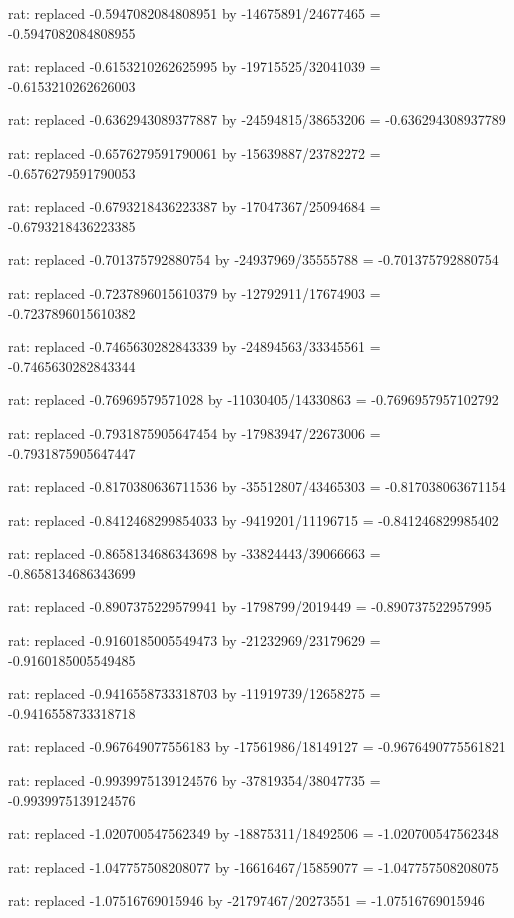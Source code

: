 \documentclass[a4paper,10pt]{article}
\begin{document}
\begin{eulernotebook}
\begin{eulercomment}
\begin{eulercomment}
\begin{eulercomment}
\begin{eulercomment}
\begin{eulercomment}
\begin{eulercomment}
\begin{eulercomment}
\begin{eulercomment}
\begin{eulercomment}
\begin{eulercomment}
\begin{eulercomment}
\begin{eulercomment}
\begin{eulercomment}
\begin{eulercomment}
\begin{eulercomment}
\begin{eulercomment}
\begin{euleroutput}
  rat: replaced -0.5947082084808951 by -14675891/24677465 = -0.5947082084808955
  
  rat: replaced -0.6153210262625995 by -19715525/32041039 = -0.6153210262626003
  
  rat: replaced -0.6362943089377887 by -24594815/38653206 = -0.636294308937789
  
  rat: replaced -0.6576279591790061 by -15639887/23782272 = -0.6576279591790053
  
  rat: replaced -0.6793218436223387 by -17047367/25094684 = -0.6793218436223385
  
  rat: replaced -0.701375792880754 by -24937969/35555788 = -0.701375792880754
  
  rat: replaced -0.7237896015610379 by -12792911/17674903 = -0.7237896015610382
  
  rat: replaced -0.7465630282843339 by -24894563/33345561 = -0.7465630282843344
  
  rat: replaced -0.76969579571028 by -11030405/14330863 = -0.7696957957102792
  
  rat: replaced -0.7931875905647454 by -17983947/22673006 = -0.7931875905647447
  
  rat: replaced -0.8170380636711536 by -35512807/43465303 = -0.817038063671154
  
  rat: replaced -0.8412468299854033 by -9419201/11196715 = -0.841246829985402
  
  rat: replaced -0.8658134686343698 by -33824443/39066663 = -0.8658134686343699
  
  rat: replaced -0.8907375229579941 by -1798799/2019449 = -0.890737522957995
  
  rat: replaced -0.9160185005549473 by -21232969/23179629 = -0.9160185005549485
  
  rat: replaced -0.9416558733318703 by -11919739/12658275 = -0.9416558733318718
  
  rat: replaced -0.967649077556183 by -17561986/18149127 = -0.9676490775561821
  
  rat: replaced -0.9939975139124576 by -37819354/38047735 = -0.9939975139124576
  
  rat: replaced -1.020700547562349 by -18875311/18492506 = -1.020700547562348
  
  rat: replaced -1.047757508208077 by -16616467/15859077 = -1.047757508208075
  
  rat: replaced -1.07516769015946 by -21797467/20273551 = -1.07516769015946
  

\end{euleroutput}
\end{eulercomment}
\end{eulercomment}
\end{eulercomment}
\end{eulercomment}
\end{eulercomment}
\end{eulercomment}
\end{eulercomment}
\end{eulercomment}
\end{eulercomment}
\end{eulercomment}
\end{eulercomment}
\end{eulercomment}
\end{eulercomment}
\end{eulercomment}
\end{eulercomment}
\end{eulercomment}
\end{eulernotebook}
\end{document}

